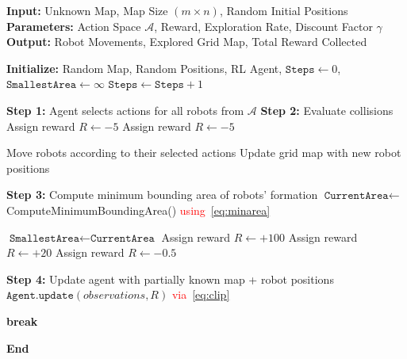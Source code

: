 \documentclass[journal]{IEEEtran}
\begin{document}
\begin{algorithm}[!t]
\caption{Reinforcement Learning-Based Multi-Robot Coordination}
\label{algo:rl_algo}
\begin{algorithmic}[1]
\State \textbf{Input:} Unknown Map, Map Size $(m \times n)$, Random  Initial Positions
\State \textbf{Parameters:} Action Space $\mathcal{A}$, Reward, Exploration Rate, Discount Factor $\gamma$
\State \textbf{Output:} Robot Movements, Explored Grid Map, Total Reward Collected
\vspace{1mm}

\State \textbf{Initialize:} Random Map, Random Positions, RL Agent, $\texttt{Steps} \gets 0$, $\texttt{SmallestArea} \gets \infty$
    \State $\texttt{Steps} \gets \texttt{Steps} + 1$

    \State \textbf{Step 1:} Agent selects actions for all robots from $\mathcal{A}$
    \State \textbf{Step 2:} Evaluate collisions
            \State Assign reward $R \gets -5$
        \EndIf
            \State Assign reward $R \gets -5$
        \EndIf
    \EndFor

        \State Move robots according to their selected actions
        \State Update grid map with new robot positions
    \EndIf

    \State \textbf{Step 3:} Compute minimum bounding area of robots' formation
    \State $\texttt{CurrentArea} \gets$ ComputeMinimumBoundingArea() \textcolor{red}{using~\eqref{eq:minarea}}

        \State $\texttt{SmallestArea} \gets \texttt{CurrentArea}$
            \State Assign reward $R \gets +100$
        \Else
            \State Assign reward $R \gets +20$
        \EndIf
    \Else
        \State Assign reward $R \gets -0.5$
    \EndIf

    \State \textbf{Step 4:} Update agent with partially known map + robot positions
    \State $\texttt{Agent.update}(observations, R)$ \textcolor{red}{via~\eqref{eq:clip}}

        \State \textbf{break}
    \EndIf
\EndWhile

\State \textbf{End}  

\end{algorithmic}
\end{algorithm}
\end{document}
